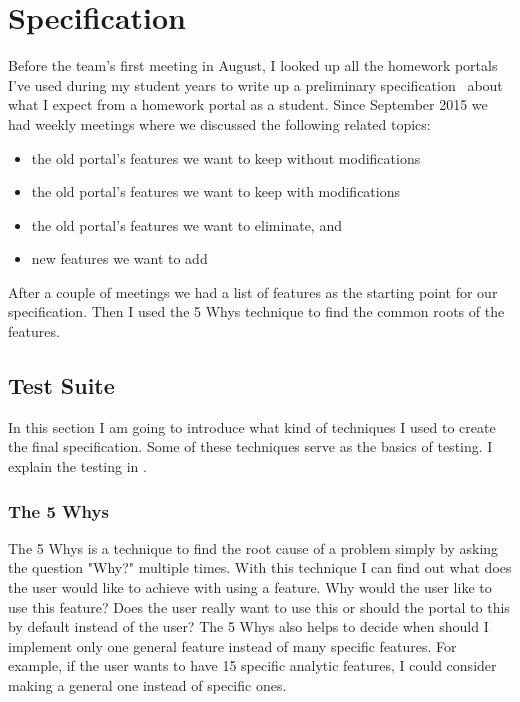 \chapter{Specification}

Before the team's first meeting in August, I looked up all the homework portals I've used during my student years to write up a preliminary specification~\cite{Szepes-specification} about what I expect from a homework portal as a student. Since September 2015 we had weekly meetings where we discussed the following related topics: 

\begin{itemize}
	\item the old portal's features we want to keep without modifications
	\item the old portal's features we want to keep with modifications
	\item the old portal's features we want to eliminate, and
	\item new features we want to add
\end{itemize}

After a couple of meetings we had a list of features as the starting point for our specification. Then I used the 5 Whys technique to find the common roots of the features. 

\section{Test Suite}
In this section I am going to introduce what kind of techniques I used to create the final specification. Some of these techniques serve as the basics of testing. I explain the testing in . 

\subsection{The 5 Whys}
\label{5-whys}

The 5 Whys is a technique to find the root cause of a problem simply by asking the question "Why?" multiple times. With this technique I can find out what does the user would like to achieve with using a feature. Why would the user like to use this feature? Does the user really want to use this or should the portal to this by default instead of the user? The 5 Whys also helps to decide when should I implement only one general feature instead of many specific features. For example, if the user wants to have 15 specific analytic features, I could consider making a general one instead of specific ones. 

